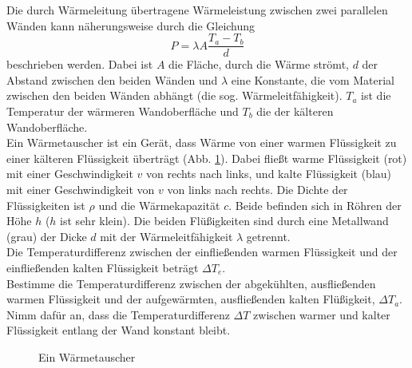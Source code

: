 \begin{Exercise}[label=heate, origin = {US IPhO Auswahlwettbewerb, Halbfinale 2013}, title = Wärmetauscher,difficulty = 4]
Die durch Wärmeleitung übertragene Wärmeleistung zwischen zwei parallelen Wänden kann näherungsweise durch die Gleichung 
\begin{equation}\label{he:fg}
	P = \lambda A \frac{T_a-T_b}{d}
\end{equation}
beschrieben werden. Dabei ist $A$ die Fläche, durch die Wärme strömt, $d$ der Abstand zwischen den beiden Wänden und $\lambda$ eine Konstante, die vom Material zwischen den beiden Wänden abhängt (die sog. Wärmeleitfähigkeit). $T_a$ ist die Temperatur der wärmeren Wandoberfläche und $T_b$ die der kälteren Wandoberfläche.\\
Ein Wärmetauscher ist ein Gerät, dass Wärme von einer warmen Flüssigkeit zu einer kälteren Flüssigkeit überträgt (Abb. \ref{fig:heate}).
Dabei fließt warme Flüssigkeit (rot) mit einer Geschwindigkeit $v$ von rechts nach links, und kalte Flüssigkeit (blau) mit einer Geschwindigkeit von $v$ von links nach rechts. Die Dichte der Flüssigkeiten ist $\rho$ und die Wärmekapazität $c$. Beide befinden sich in Röhren der Höhe $h$ ($h$ ist sehr klein).  Die beiden Flüßigkeiten sind durch eine Metallwand (grau) der Dicke $d$ mit der Wärmeleitfähigkeit $\lambda$ getrennt. \\
Die Temperaturdifferenz zwischen der einfließenden warmen Flüssigkeit und der einfließenden kalten Flüssigkeit beträgt $\Delta T_e$. \\
Bestimme die Temperaturdifferenz zwischen der abgekühlten, ausfließenden warmen Flüssigkeit und der aufgewärmten, ausfließenden kalten Flüßigkeit, $\Delta T_a$. Nimm dafür an, dass die Temperaturdifferenz $\Delta T$ zwischen warmer und kalter Flüssigkeit entlang der Wand konstant bleibt.

\end{Exercise}
\begin{figure}[h]
	\centering
	
	\caption{Ein Wärmetauscher}
	\label{fig:heate}
\end{figure}
